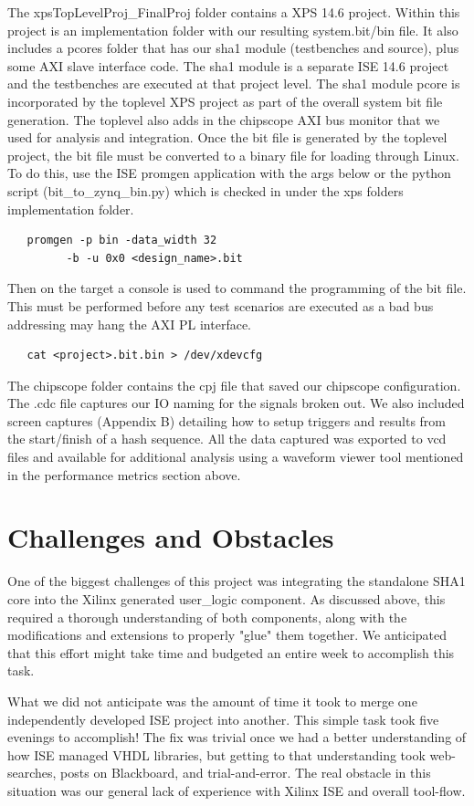 \documentclass[journal]{IEEEtran}
\begin{document}
The xpsTopLevelProj\_FinalProj folder contains a XPS 14.6 project.  Within this project is an implementation folder with our resulting system.bit/bin file.  It also includes a pcores folder that has our sha1 module (testbenches and source), plus some AXI slave interface code.  The sha1 module is a separate ISE 14.6 project and the testbenches are executed at that project level.  The sha1 module pcore is incorporated by the toplevel XPS project as part of the overall system bit file generation.  The toplevel also adds in the chipscope AXI bus monitor that we used for analysis and integration.  Once the bit file is generated by the toplevel project, the bit file must be converted to a binary file for loading through Linux.  To do this, use the ISE promgen application with the args below or the python script (bit\_to\_zynq\_bin.py) which is checked in under the xps folders implementation folder.
\begin{verbatim}
   promgen -p bin -data_width 32 
         -b -u 0x0 <design_name>.bit
\end{verbatim}
Then on the target a console is used to command the programming of the bit file.  This must be performed before any test scenarios are executed as a bad bus addressing may hang the AXI PL interface.
\begin{verbatim}
   cat <project>.bit.bin > /dev/xdevcfg
\end{verbatim}
The chipscope folder contains the cpj file that saved our chipscope configuration.  The .cdc file captures our IO naming for the signals broken out.  We also included screen captures (Appendix B) detailing how to setup triggers and results from the start/finish of a hash sequence.  All the data captured was exported to vcd files and available for additional analysis using a waveform viewer tool mentioned in the performance metrics section above.

\section{Challenges and Obstacles}
One of the biggest challenges of this project was integrating the standalone SHA1 core into the Xilinx generated user\_logic component.  As discussed above, this required a thorough understanding of both components, along with the modifications and extensions to properly "glue" them together.  We anticipated that this effort might take time and budgeted an entire week to accomplish this task.

What we did not anticipate was the amount of time it took to merge one independently developed ISE project into another.  This simple task took five evenings to accomplish!  The fix was trivial once we had a better understanding of how ISE managed VHDL libraries, but getting to that understanding took web-searches, posts on Blackboard, and trial-and-error.  The real obstacle in this situation was our general lack of experience with Xilinx ISE and overall tool-flow.
\end{document}
